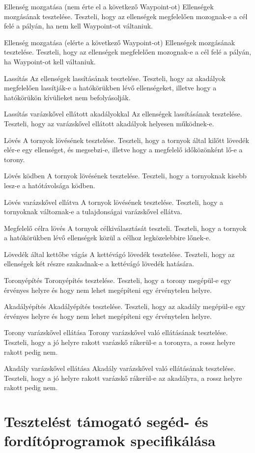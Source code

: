 \teszteset
{Ellenség mozgatása (nem érte el a következő Waypoint-ot)} %
{Ellenségek mozgásának tesztelése.} %
{Teszteli, hogy az ellenségek megfelelően mozognak-e a cél felé a pályán, ha nem kell Waypoint-ot váltaniuk.} %

\teszteset
{Ellenség mozgatása (elérte a következő Waypoint-ot)}
{Ellenségek mozgásának tesztelése.}
{Teszteli, hogy az ellenségek megfelelően mozognak-e a cél felé a pályán, ha Waypoint-ot kell váltaniuk.}

\teszteset
{Lassítás}
{Az ellenségek lassításának tesztelése.}
{Teszteli, hogy az akadályok megfelelően lassítják-e a hatókörükben lévő ellenségeket, illetve hogy a hatókörükön kívülieket nem befolyásolják.}

\teszteset
{Lassítás varázskővel ellátott akadályokkal}
{Az ellenségek lassításának tesztelése.}
{Teszteli, hogy az varázskővel ellátott akadályok helyesen működnek-e.}

\teszteset
{Lövés}
{A tornyok lövésének tesztelése.}
{Teszteli, hogy a tornyok által kilőtt lövedék elér-e egy ellenséget, és megsebzi-e, illetve hogy a megfelelő időközönként lő-e a torony.}

\teszteset
{Lövés ködben}
{A tornyok lövésének tesztelése.}
{Teszteli, hogy a tornyoknak kisebb lesz-e a hatótávolsága ködben.}

\teszteset
{Lövés varázskővel ellátva}
{A tornyok lövésének tesztelése.}
{Teszteli, hogy a tornyoknak változnak-e a tulajdonságai varázskővel ellátva.}

\teszteset
{Megfelelő célra lövés}
{A tornyok célkiválasztását teszteli.}
{Teszteli, hogy a tornyok a hatókörükben lévő ellenségek közül a célhoz legközelebbire lőnek-e.}

\teszteset
{Lövedék által kettőbe vágás}
{A kettévágó lövedék tesztelése.}
{Teszteli, hogy az ellenségek két részre szakadnak-e a kettévágó lövedék hatására.}

\teszteset
{Toronyépítés}
{Toronyépítés tesztelése.}
{Teszteli, hogy a torony megépül-e egy érvényes helyre és hogy nem lehet megépíteni egy érvénytelen helyre.}

\teszteset
{Akadályépítés}
{Akadályépítés tesztelése.}
{Teszteli, hogy az akadály megépül-e egy érvényes helyre és hogy nem lehet megépíteni egy érvénytelen helyre.}

\teszteset
{Torony varázskővel ellátása}
{Torony varázskővel való ellátásának tesztelése.}
{Teszteli, hogy a jó helyre rakott varázskő rákerül-e a toronyra, a rossz helyre rakott pedig nem.}

\teszteset
{Akadály varázskővel ellátása}
{Akadály varázskővel való ellátásának tesztelése.}
{Teszteli, hogy a jó helyre rakott varázskő rákerül-e az akadályra, a rossz helyre rakott pedig nem.}

\section{Tesztelést támogató segéd- és fordítóprogramok specifikálása}

